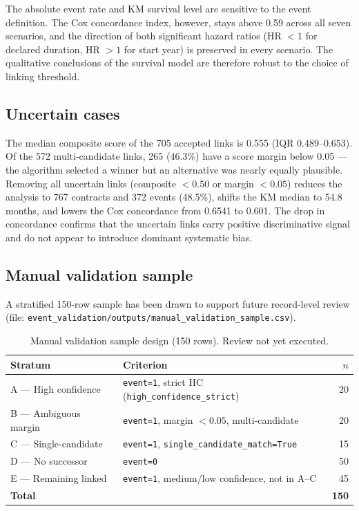 \documentclass[11pt,a4paper]{article}
\begin{document}
The absolute event rate and KM survival level are sensitive to the event
definition. The Cox concordance index, however, stays above 0.59 across all
seven scenarios, and the direction of both significant hazard ratios (HR $< 1$
for declared duration, HR $> 1$ for start year) is preserved in every scenario.
The qualitative conclusions of the survival model are therefore robust to the
choice of linking threshold.

\subsection*{Uncertain cases}

The median composite score of the 705 accepted links is 0.555 (IQR 0.489--0.653).
Of the 572 multi-candidate links, 265 (46.3\%) have a score margin below
0.05 --- the algorithm selected a winner but an alternative was nearly equally
plausible. Removing all uncertain links (composite $< 0.50$ or margin $< 0.05$)
reduces the analysis to 767 contracts and 372 events (48.5\%), shifts the KM
median to 54.8 months, and lowers the Cox concordance from 0.6541 to 0.601.
The drop in concordance confirms that the uncertain links carry positive
discriminative signal and do not appear to introduce dominant systematic bias.

\subsection*{Manual validation sample}

A stratified 150-row sample has been drawn to support future record-level
review (file: \nolinkurl{event_validation/outputs/manual_validation_sample.csv}).

\begin{table}[H]
\centering
\caption{Manual validation sample design (150 rows). Review not yet executed.}
\label{tab:valdesign}
\small
\begin{tabularx}{\linewidth}{@{}L{3.0cm}Y r@{}}
\toprule
\textbf{Stratum} & \textbf{Criterion} & \textbf{$n$} \\
\midrule
A --- High confidence & \texttt{event=1}, strict HC (\nolinkurl{high_confidence_strict}) & 20 \\
B --- Ambiguous margin & \texttt{event=1}, margin $< 0.05$, multi-candidate & 20 \\
C --- Single-candidate & \texttt{event=1}, \nolinkurl{single_candidate_match=True} & 15 \\
D --- No successor & \texttt{event=0} & 50 \\
E --- Remaining linked & \texttt{event=1}, medium/low confidence, not in A--C & 45 \\
\midrule
\textbf{Total} & & \textbf{150} \\
\bottomrule
\end{tabularx}
\end{table}
\end{document}
